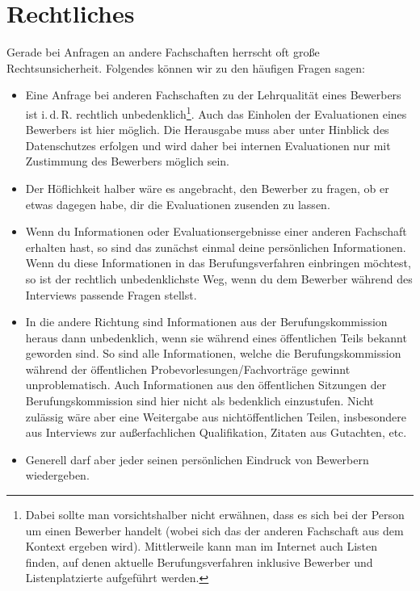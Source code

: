 \documentclass[10pt,twoside,a5paper,openright]{book}
\begin{document}
\section{Rechtliches}\label{sec:rechtliches}
Gerade bei Anfragen an andere Fachschaften herrscht oft große Rechtsunsicherheit. Folgendes können wir zu den häufigen Fragen sagen:
\begin{itemize}
	\item Eine Anfrage bei anderen Fachschaften zu der Lehrqualität eines Bewerbers ist i.\,d.\,R. rechtlich unbedenklich\footnote{Dabei sollte man vorsichtshalber nicht erwähnen, dass es sich bei der Person um einen Bewerber handelt (wobei sich das der anderen Fachschaft aus dem Kontext ergeben wird). Mittlerweile
	kann man im Internet auch Listen finden, auf denen aktuelle Berufungsverfahren inklusive Bewerber und Listenplatzierte aufgeführt werden.}. Auch das Einholen der Evaluationen eines Bewerbers ist hier möglich. Die Herausgabe muss aber unter Hinblick des Datenschutzes erfolgen und wird daher bei internen Evaluationen nur mit Zustimmung des Bewerbers möglich sein.
	
	\item Der Höflichkeit halber wäre es angebracht, den Bewerber zu fragen, ob er etwas dagegen habe, dir die Evaluationen zusenden zu lassen.
	
	\item Wenn du Informationen oder Evaluationsergebnisse einer anderen Fachschaft erhalten hast, so sind das zunächst einmal deine persönlichen Informationen. Wenn du diese Informationen in das Berufungsverfahren einbringen möchtest, so ist der rechtlich unbedenklichste Weg, wenn du dem Bewerber während des Interviews passende Fragen stellst.

	\item In die andere Richtung sind Informationen aus der Berufungskommission heraus dann unbedenklich, wenn sie während eines öffentlichen Teils bekannt geworden sind. So sind alle Informationen, welche die Berufungskommission während der öffentlichen Probevorlesungen/Fachvorträge gewinnt unproblematisch. Auch Informationen aus den öffentlichen Sitzungen der Berufungskommission sind hier nicht als bedenklich einzustufen. Nicht zulässig wäre aber eine Weitergabe aus nichtöffentlichen Teilen, insbesondere aus Interviews zur außerfachlichen Qualifikation, Zitaten aus Gutachten, etc.
	
	\item Generell darf aber jeder seinen persönlichen Eindruck von Bewerbern wiedergeben.
\end{itemize}
\end{document}

